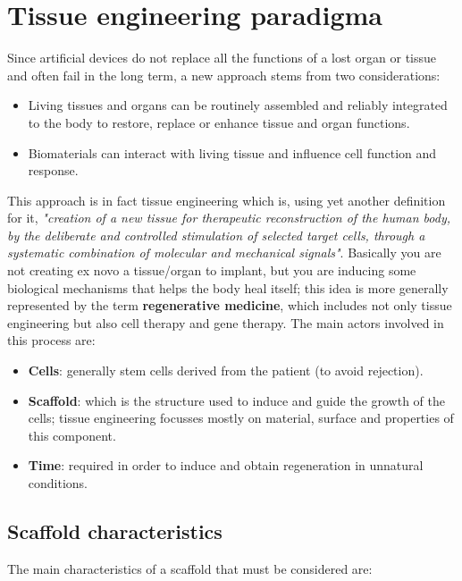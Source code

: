 \section{Tissue engineering paradigma}
Since artificial devices do not replace all the functions of a lost organ or tissue and often fail in the long term, a new approach stems from two considerations:

\begin{multicols}{2}
  \begin{itemize}
    \item Living tissues and organs can be routinely assembled and reliably integrated to the body to restore, replace or enhance tissue and organ functions.
    \item Biomaterials can interact with living tissue and influence cell function and response.
  \end{itemize}
\end{multicols}

This approach is in fact tissue engineering which is, using yet another definition for it, \textit{"creation of a new tissue for therapeutic reconstruction of the human body, by the deliberate and controlled stimulation of selected target cells, through a systematic combination of molecular and mechanical signals"}.
Basically you are not creating ex novo a tissue/organ to implant, but you are inducing some biological mechanisms that helps the body heal itself; this idea is more generally represented by the term \textbf{regenerative medicine}, which includes not only tissue engineering but also cell therapy and gene therapy.
The main actors involved in this process are:

\begin{multicols}{2}
  \begin{itemize}
    \item \textbf{Cells}: generally stem cells derived from the patient (to avoid rejection).
    \item \textbf{Scaffold}: which is the structure used to induce and guide the growth of the cells; tissue engineering focusses mostly on material, surface and properties of this component.
    \item \textbf{Time}: required in order to induce and obtain regeneration in unnatural conditions.
  \end{itemize}
\end{multicols}

  \subsection{Scaffold characteristics}
  The main characteristics of a scaffold that must be considered are:

